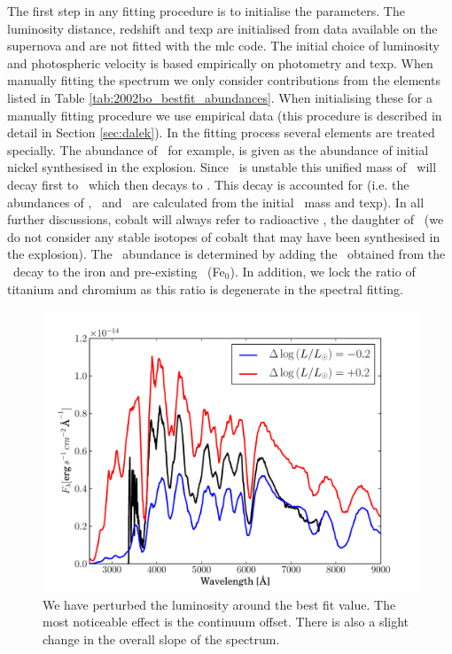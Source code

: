 The first step in any fitting procedure is to initialise the parameters. The luminosity distance, redshift and \gls{texp} are initialised from data available on the supernova and are not fitted with the \gls{mlc} code. The initial choice of luminosity and photospheric velocity is based empirically on photometry and \gls{texp}. When manually fitting the spectrum we only consider contributions from the elements listed in Table \ref{tab:2002bo_bestfit_abundances}. When initialising these for a manually fitting procedure we use empirical data (this procedure is described in detail in Section \ref{sec:dalek}). In the fitting process several elements are treated specially. The abundance of \Ni\, for example, is given as the abundance of initial nickel synthesised in the explosion. Since \Ni\ is unstable this unified mass of \Ni\ will decay first to \Co\ which then decays to \Fe. This decay is accounted for (i.e. the abundances of \Ni, \Co\ and \Fe\ are calculated from the initial \Ni\ mass and \gls{texp}). In all further discussions, cobalt will always refer to radioactive \Co, the daughter of \Ni\ (we do not consider any stable isotopes of cobalt that may have been synthesised in the explosion). The \Fe\ abundance is determined by adding the \Fe\ obtained from the \Ni\ decay to the iron and pre-existing \Fe\ (Fe$_0$). In addition, we lock the ratio of titanium and chromium as this ratio is degenerate in the spectral fitting. 



\begin{figure}[tb] %
   \centering
   \includegraphics[width=1\textwidth, trim=0 0 1cm 0, clip]{chapter_dalek/plots/bf2002bo-10_lum.pdf} 
   \caption[Effect of luminosity on MLMC fit]{We have perturbed the luminosity around the best fit value. The most noticeable effect is the continuum offset. There is also a slight change in the overall slope of the spectrum.} 
   \label{fig:sn2002bo_lum_offset}
\end{figure}

